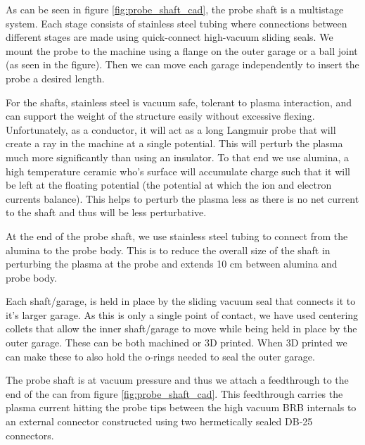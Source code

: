 As can be seen in figure \ref{fig:probe_shaft_cad}, the probe shaft is a multistage system. Each stage consists of stainless steel tubing where connections between different stages are made using quick-connect high-vacuum sliding seals. We mount the probe to the machine using a flange on the outer garage or a ball joint (as seen in the figure). Then we can move each garage independently to insert the probe a desired length.



For the shafts, stainless steel is vacuum safe, tolerant to plasma interaction, and can support the weight of the structure easily without excessive flexing. Unfortunately, as a conductor, it will act as a long Langmuir probe that will create a ray in the machine at a single potential. This will perturb the plasma much more significantly than using an insulator. To that end we use alumina, a high temperature ceramic who's surface will accumulate charge such that it will be left at the floating potential (the potential at which the ion and electron currents balance). This helps to perturb the plasma less as there is no net current to the shaft and thus will be less perturbative.

At the end of the probe shaft, we use stainless steel tubing to connect from the alumina to the probe body. This is to reduce the overall size of the shaft in perturbing the plasma at the probe and extends 10 cm between alumina and probe body.

Each shaft/garage, is held in place by the sliding vacuum seal that connects it to it's larger garage. As this is only a single point of contact, we have used centering collets that allow the inner shaft/garage to move while being held in place by the outer garage. These can be both machined or 3D printed. When 3D printed we can make these to also hold the o-rings needed to seal the outer garage.

The probe shaft is at vacuum pressure and thus we attach a feedthrough to the end of the can from figure \ref{fig:probe_shaft_cad}. This feedthrough carries the plasma current hitting the probe tips between the high vacuum BRB internals to an external connector constructed using two hermetically sealed DB-25 connectors.

